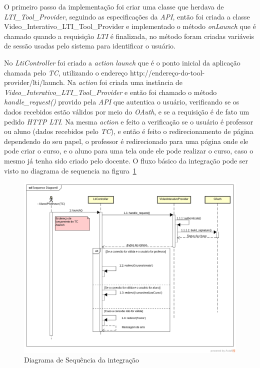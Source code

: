 \begin{sloppypar}
  O primeiro passo da implementação foi criar uma classe que herdava de \textit{LTI\_Tool\_Provider}, seguindo as especificações da \textit{API}, então foi criada a classe Video\_Interativo\_LTI\_Tool\_Provider e implementado o método \textit{onLaunch} que é chamado quando a requisição \textit{LTI} é finalizada, no método foram criadas variáveis de sessão usadas pelo sistema para identificar o usuário.
\end{sloppypar}

No \textit{LtiController} foi criado a \textit{action launch} que é o ponto inicial da aplicação chamada pelo \textit{TC}, utilizando o endereço http://endereço-do-tool-provider/lti/launch. Na \textit{action} foi criada uma instância de \textit{Video\_Interativo\_LTI\_Tool\_Provider} e então foi chamado o método \textit{handle\_request()} provido pela \textit{API} que autentica o usuário, verificando se os dados recebidos estão válidos por meio do \textit{OAuth}, e se a requisição é de fato um pedido \textit{HTTP LTI}. Na mesma \textit{action} e feito a verificação se o usuário é professor ou aluno (dados recebidos pelo \textit{TC}), e então é feito o redirecionamento de página dependendo do seu papel, o professor é redirecionado para uma página onde ele pode criar o curso, e o aluno para uma tela onde ele pode realizar o curso, caso o mesmo já tenha sido criado pelo docente. O fluxo básico da integração pode ser visto no diagrama de sequencia na figura~\ref{fig:diagrama-sequencia-lti}

\begin{figure}[htbp]
    \centering
    \includegraphics[keepaspectratio=true,scale=0.45]{figuras/diagrama_sequencia_lti.png}
    \caption{Diagrama de Sequência da integração}
    \label{fig:diagrama-sequencia-lti}
\end{figure}

